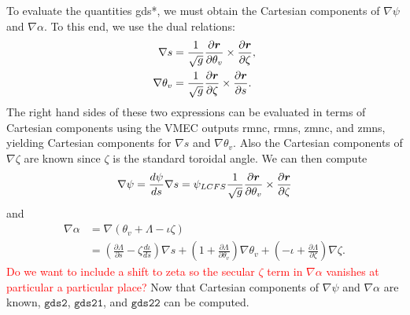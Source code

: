 \documentclass[11pt,letter]{article}
\newcommand{\vect}[1]{\mbox{\boldmath $#1$}}
\newcommand{\todo}[1]{\textcolor{red}{#1}}
\newcommand{\gdstwo}{\mathtt{gds2}}
\newcommand{\gdstwoone}{\mathtt{gds21}}
\newcommand{\gdstwotwo}{\mathtt{gds22}}
\begin{document}
To evaluate the quantities {\ttfamily gds*}, we must obtain the Cartesian components of
$\nabla\psi$ and $\nabla \alpha$. To this end, we use the dual relations:
\begin{align}
\nabla s &=  \frac{1}{\sqrt{g}} \frac{\partial\vect{r}}{\partial\theta_v} \times \frac{\partial\vect{r}}{\partial\zeta}, \label{eq:nabla_s}\\
\nabla\theta_v &= \frac{1}{\sqrt{g}} \frac{\partial\vect{r}}{\partial\zeta} \times \frac{\partial\vect{r}}{\partial s}
\label{eq:nabla_theta}.
\end{align}
The right hand sides of these two expressions can be evaluated in terms of Cartesian components using the VMEC
outputs {\ttfamily rmnc}, {\ttfamily rmns}, {\ttfamily zmnc}, and {\ttfamily zmns}, yielding
Cartesian components for $\nabla s$ and $\nabla\theta_v$. Also the Cartesian components of $\nabla\zeta$
are known since $\zeta$ is the standard toroidal angle.
We can then compute
\begin{equation}
\nabla\psi = \frac{d\psi}{ds} \nabla s = \psi_{LCFS}  \frac{1}{\sqrt{g}} \frac{\partial\vect{r}}{\partial\theta_v} \times \frac{\partial\vect{r}}{\partial\zeta}
\end{equation}
and
\begin{align}
\nabla\alpha 
&= \nabla(\theta_v + \Lambda - \iota \zeta) \nonumber \\
&= \left(\frac{\partial\Lambda}{\partial s} - \zeta \frac{d\iota}{ds}\right)\nabla s
+ \left( 1 + \frac{\partial\Lambda}{\partial\theta_v}\right) \nabla\theta_v
+ \left( -\iota + \frac{\partial\Lambda}{\partial\zeta}\right) \nabla\zeta.
\label{eq:grad_alpha}
\end{align}
\todo{Do we want to include a shift to zeta so the secular $\zeta$ term in $\nabla\alpha$ vanishes at particular a particular place?}
Now that Cartesian components of $\nabla\psi$ and $\nabla \alpha$ are known, $\gdstwo$, $\gdstwoone$, and $\gdstwotwo$ can be computed. 
\end{document}
